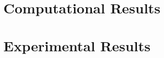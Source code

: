 \documentclass[a4paper, oneside, 11pt]{report} %
\begin{document}
\part{Computational Results}

\newpage


\newpage


\part{Experimental Results}

\newpage


\newpage

\end{document}
